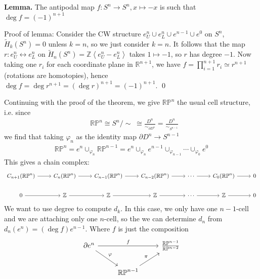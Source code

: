 \documentclass[11pt]{article}
\theoremstyle{definition}
\newcommand{\gen}[1]{\left\langle #1 \right\rangle}
\begin{document}
    \textbf{Lemma.} The antipodal map \(f: S^n \to S^n, x \mapsto -x\) is such that \(\deg f = (-1)^{n+1}\)

    Proof of lemma: Consider the CW structure \(e_U^n \cup e_L^n \cup e^{n-1} \cup e^0\) on \(S^n\), \(\tilde{H}_k(S^n) = 0\) unless \(k=n\), so we just consider \(k=n\). It follows that the map \(r: e_U^n \leftrightarrow e_L^n\) on \(\tilde{H}_n(S^n) = \mathbb{Z}\gen{e_U^n - e_L^n}\) takes \(1 \mapsto -1\), so \(r\) has degree \(-1\). Now taking one \(r_i\) for each coordinate plane in \(\mathbb{R}^{n+1}\), we have \(f = \prod_{i=1}^{n+1} r_i \simeq r^{n+1}\) (rotations are homotopies), hence \(\deg f = \deg r^{n+1} = (\deg r)^{n+1} = (-1)^{n+1}\). \qed

    Continuing with the proof of the theorem, we give \(\mathbb{RP}^n\) the usual cell structure, i.e. since
    \begin{align*}
        &\mathbb{RP}^n \cong S^n/\!\!\sim \;\cong \frac{D^n}{\sim_{\partial D^n}} = \frac{D^n}{\sim_{S^{n-1}}}
    \end{align*}
    we find that taking \(\varphi_n\) as the identity map \(\partial D^n \to S^{n-1}\)
    \begin{align*}
        \mathbb{RP}^n = e^n \cup_{\varphi_n} \mathbb{RP}^{n-1} = e^n \cup_{\varphi_n} e^{n-1} \cup_{\varphi_{n-1}} \cdots \cup_{\varphi_0} e^0
    \end{align*}
    This gives a chain complex:
    \begin{equation*}
        \begin{tikzcd}
            C_{n+1}(\mathbb{RP}^n) \arrow[r] &C_n(\mathbb{RP}^n) \arrow[r] &C_{n-1}(\mathbb{RP}^n) \arrow[r] &C_{n-2}(\mathbb{RP}^n) \arrow[r] &\cdots \arrow[r] &C_0(\mathbb{RP}^n) \arrow[r] & 0 \\
            0 \arrow[r] &\mathbb{Z} \arrow[r] &\mathbb{Z} \arrow[r] &\mathbb{Z} \arrow[r] &\cdots \arrow[r] &\mathbb{Z} \arrow[r] & 0
        \end{tikzcd}
    \end{equation*}
    We want to use degree to compute \(d_k\). In this case, we only have one \(n-1\)-cell and we are attaching only one \(n\)-cell, so the we can determine \(d_n\) from \(d_n(e^n) = (\deg f) e^{n-1}\). Where \(f\) is just the composition
    \begin{equation*}
        \begin{tikzcd}
            \partial e^n \arrow[rr,"{f}"] \arrow[rd,"{\varphi}"]&  &\frac{\mathbb{RP}^{n-1}}{\mathbb{RP}^{n-2}} \\
            &\mathbb{RP}^{n-1} \arrow[ru,"{\pi}"]
        \end{tikzcd}
    \end{equation*}
\end{document}
